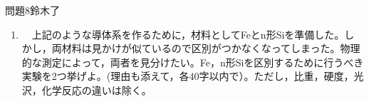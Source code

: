 \documentclass[fleqn]{jbook}
\def\F{{\rm F}}
\def\L{{\rm L}}
\def\R{{\rm R}}
\def\ds{\displaystyle}
\begin{document}
\begin{question}{問題8}{鈴木了}
\begin{enumerate}
    \begin{enumerate}
    
    \item 　先ず，1次元自由電子気体の，エネルギー$E$に対する単位長さ当たりの状態密度$D(E)$，及び絶対零度におけるフェルミ速度$v_\F$を，$m$，$h$（プランク定数），$N$を用いて表せ。\\
    
    \item 　図(a)に示した，障壁がある系におけるエネルギー分布を図(b)のように表す。すなわち，障壁の左側と右側の電子のフェルミ・エネルギーを，それぞれ$E_{\F\L},E_{\F\R}$，温度$T$における分布関数をそれぞれ$f_\L(E,T),f_\R(E,T)$とする。なお，電子気体は低温で縮退しているものとする。このとき，1次元導体を左から右へ流れる全電流$J$は，障壁を境として左から右に流れ込む電子による全電流$J_{\L\R}$と，右から左に流れ込む電子による全電流$J_{\R\L}$の差$(J=J_{\L\R}-J_{\R\L})$として与えられる。$J_{\L\R}$は
\begin{equation}
 J_{\L\R}=-\frac{e}{2} \int_0^{\infty}\sqrt{\frac{2E}{m}}D(E)f_\L(E,T)
   [1-f_\R(E,T)]T(E)\d E
\end{equation}
で与えられることを説明せよ。\\

    \item 　図(c)に示すように，障壁の両端間に僅かの電圧$\Delta V$を加えて左側の電子のフェルミ・エネルギーを右側より$\Delta\mu~(\ll E_{\F\L} \approx E_{\F\R})$だけ高くすると，全電流が$\Delta J$だけ発生する。温度を絶対零度として$\Delta J$を計算し，G=$\ds \mathop {\lim }\limits_{\Delta V \to 0}\frac{\Delta J}{\Delta V}$で与えられる電気伝導度が
$$
G=\left(\frac{2e^2}{h}\right)T(E_{\F\L})
$$
と表せることを示せ。なお，$\Delta\mu$と$\Delta V$の間には$\Delta\mu=-e\Delta V$の関係がある。\\

\end{enumerate}

  \item 　上記のような導体系を作るために，材料としてFeとn形Siを準備した。しかし，両材料は見かけが似ているので区別がつかなくなってしまった。物理的な測定によって，両者を見分けたい。Fe，n形Siを区別するために行うべき実験を2つ挙げよ。(理由も添えて，各40字以内で）。ただし，比重，硬度，光沢，化学反応の違いは除く。\\
  
\end{enumerate}


\end{question}
\end{document}
